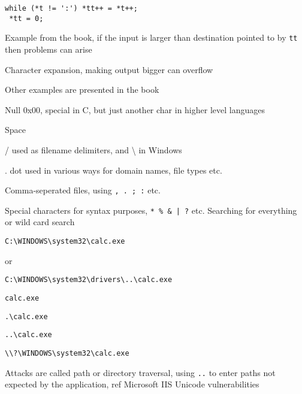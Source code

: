 \documentclass[Screen16to9,17pt]{foils}
\begin{document}
\begin{verbatim}
while (*t != ':') *tt++ = *t++;
 *tt = 0;
\end{verbatim}

\begin{list2}
\item Example from the book, if the input is larger than destination pointed to by \verb+tt+ then problems can arise
\item Character expansion, making output bigger can overflow
\item Other examples are presented in the book
\end{list2}


\begin{list2}
\item Null 0x00, special in C, but just another char in higher level languages
\item Space
\item / used as filename delimiters, and \textbackslash{} in Windows
\item . dot used in various ways for domain names, file types etc.
\item Comma-seperated files, using \verb+, . ; :+ etc.
\item Special characters for syntax purposes, \verb+* % & | ?+ etc. Searching for everything or wild card search
\end{list2}




\verb+C:\WINDOWS\system32\calc.exe+

or
\begin{list2}
\item \verb+C:\WINDOWS\system32\drivers\..\calc.exe+
\item \verb+calc.exe+
\item \verb+.\calc.exe+
\item \verb+..\calc.exe+
\item \verb+\\?\WINDOWS\system32\calc.exe+
\item Attacks are called path or directory traversal, using \verb+..+ to enter paths not expected by the application, ref Microsoft IIS Unicode vulnerabilities
\end{list2}



\end{document}
